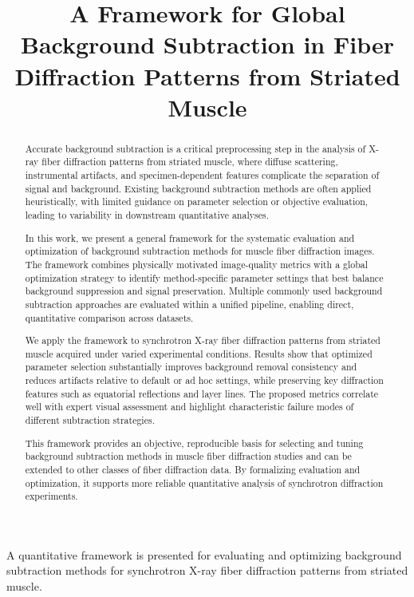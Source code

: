 \documentclass[iucr,review]{iucrjournals}
\title{A Framework for Global Background Subtraction in Fiber Diffraction Patterns from Striated Muscle}
\begin{document}
\maketitle

\begin{synopsis}
A quantitative framework is presented for evaluating and optimizing background subtraction methods for synchrotron X-ray fiber diffraction patterns from striated muscle.
\end{synopsis}


\begin{abstract}

Accurate background subtraction is a critical preprocessing step in the analysis of X-ray fiber diffraction patterns from striated muscle, where diffuse scattering, instrumental artifacts, and specimen-dependent features complicate the separation of signal and background. Existing background subtraction methods are often applied heuristically, with limited guidance on parameter selection or objective evaluation, leading to variability in downstream quantitative analyses.

In this work, we present a general framework for the systematic evaluation and optimization of background subtraction methods for muscle fiber diffraction images. The framework combines physically motivated image-quality metrics with a global optimization strategy to identify method-specific parameter settings that best balance background suppression and signal preservation. Multiple commonly used background subtraction approaches are evaluated within a unified pipeline, enabling direct, quantitative comparison across datasets.

We apply the framework to synchrotron X-ray fiber diffraction patterns from striated muscle acquired under varied experimental conditions. Results show that optimized parameter selection substantially improves background removal consistency and reduces artifacts relative to default or ad hoc settings, while preserving key diffraction features such as equatorial reflections and layer lines. The proposed metrics correlate well with expert visual assessment and highlight characteristic failure modes of different subtraction strategies.

This framework provides an objective, reproducible basis for selecting and tuning background subtraction methods in muscle fiber diffraction studies and can be extended to other classes of fiber diffraction data. By formalizing evaluation and optimization, it supports more reliable quantitative analysis of synchrotron diffraction experiments.

\end{abstract}
\end{document}
